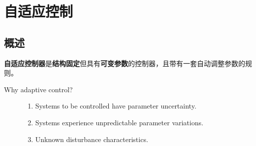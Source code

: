 \chapter{自适应控制}\label{cp4}
\section{概述}\label{4Aref}




\begin{definition}
    \textbf{自适应控制器}是\textbf{结构固定}但具有\textbf{可变参数}的控制器，且带有一套自动调整参数的规则。
  \end{definition}
  
  \begin{description}
    \item[Why adaptive control?]
    \begin{enumerate}
      \item Systems to be controlled have {\textsf{parameter uncertainty}}.
      
      \item Systems experience {\textsf{unpredictable parameter variations}}.
      
      \item Unknown {\textsf{disturbance characteristics}}.
    \end{enumerate}
  \end{description}
  
